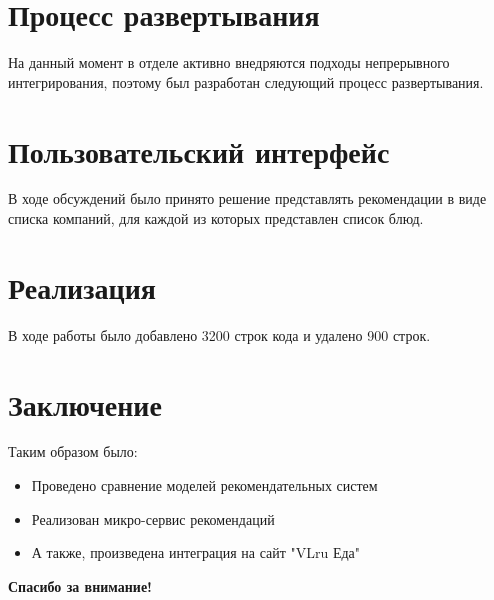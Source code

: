 \documentclass{fefu}
\begin{document}
  \section{Процесс развертывания}
  На данный момент в отделе активно внедряются подходы непрерывного интегрирования,
  поэтому был разработан следующий процесс развертывания.

  \section{Пользовательский интерфейс}
  В ходе обсуждений было принято решение представлять рекомендации в виде списка
  компаний, для каждой из которых представлен список блюд.

  \section{Реализация}
  В ходе работы было добавлено 3200 строк кода и удалено 900 строк.

  \section{Заключение}
  Таким образом было:
  \begin{itemize}
    \item Проведено сравнение моделей рекомендательных систем
    \item Реализован микро-сервис рекомендаций
    \item А также, произведена интеграция на сайт "VLru Еда"
  \end{itemize}

  \textbf{Спасибо за внимание!}
\end{document}
